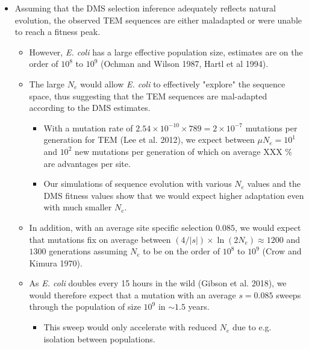 \documentclass[12pt]{article}
\begin{document}
\begin{itemize}
	\item Assuming that the DMS selection inference adequately reflects natural evolution, the observed TEM sequences are either maladapted or were unable to reach a fitness peak.
	\begin{itemize}
		\item However, \textit{E. coli} has a large effective population size, estimates are on the order of $10^8$ to $10^9$ (Ochman and Wilson 1987, Hartl et al 1994).
		\item The large $N_e$ would allow \textit{E. coli} to effectively "explore" the sequence space, thus suggesting that the TEM sequences are mal-adapted according to the DMS estimates.
		\begin{itemize}
			\item With a mutation rate of $2.54\times 10^{-10} \times 789 = 2\times 10^{-7}$ mutations per generation for TEM (Lee et al. 2012), we expect between $\mu N_e = 10^1$ and $10^2$ new mutations per generation of which on average XXX \% are advantages per site.
			\item Our simulations of sequence evolution with various $N_e$ values and the DMS fitness values show that we would expect higher adaptation even with much smaller $N_e$.
		\end{itemize}
		\item In addition, with an average site specific selection $0.085$, we would expect that mutations fix on average between $(4/|s|)\times \ln(2N_e) \approx 1200$ and $1300$ generations assuming $N_e$ to be on the order of $10^8$ to $10^9$ (Crow and Kimura 1970).
		\item As \textit{E. coli} doubles every 15 hours in the wild (Gibson et al. 2018), we would therefore expect that a mutation with an average $s = 0.085$ sweeps through the population of size $10^9$ in $\sim 1.5$ years.
		\begin{itemize}
			\item This sweep would only accelerate with reduced $N_e$ due to e.g. isolation between populations.
		\end{itemize}
	\end{itemize}
	

\end{itemize}
\end{document}
